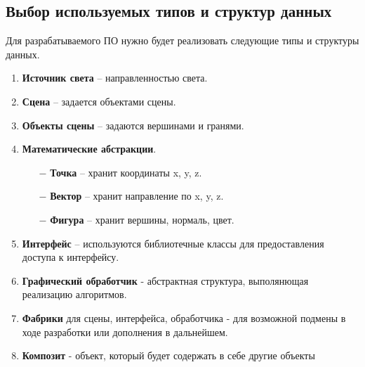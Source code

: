 \subsection{Выбор используемых типов и структур данных}
Для разрабатываемого ПО нужно будет реализовать следующие типы и
структуры данных.
\begin{enumerate}
\item \textbf{Источник света} – направленностью света.
\item \textbf{Сцена} – задается объектами сцены.
\item \textbf{Объекты сцены} – задаются вершинами и гранями.
\item \textbf{Математические абстракции}.
    \begin{enumerate}
        \item[$-$] \textbf{Точка} – хранит координаты x, y, z.
        \item[$-$] \textbf{Вектор} – хранит направление по x, y, z.
        \item[$-$] \textbf{Фигура} – хранит вершины, нормаль, цвет.
    \end{enumerate}
\item \textbf{Интерфейс} – используются библиотечные классы для предоставления доступа к интерфейсу.
\item \textbf{Графический обработчик} - абстрактная структура, выполянющая реализацию алгоритмов.
\item \textbf{Фабрики} для сцены, интерфейса, обработчика - для возможной подмены в ходе разработки или дополнения в дальнейшем.
\item \textbf{Композит} - объект, который будет содержать в себе другие объекты
\end{enumerate}
